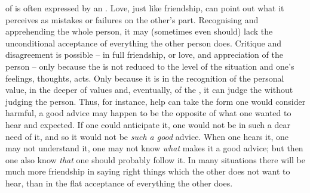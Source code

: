 \pa {} of  is often expressed by an .
Love, just like friendship, can point out what it perceives as mistakes or
failures on the other's part.  Recognising and apprehending the whole person, it
may (sometimes even should) lack the unconditional acceptance of everything the
other person does. Critique and disagreement is possible -- in full friendship,
or love, and appreciation of the person -- only because the  is
not reduced to the level of the  situation and one's feelings,
thoughts, acts.  Only because it is  in the recognition of the
personal value, in the deeper  of values and, eventually, of the
, it can judge the  without judging the person.  Thus, for
instance, help can take the form one would consider harmful, a good advice may
happen to be the opposite of what one wanted to hear and expected. If one
could anticipate it, one would not be in such a dear need of it, and so it would
not be {\em such a good} advice. When one hears it, one may not understand it,
one may not know {\em what} makes it a good advice; but then one also know {\em
  that} one should probably follow it.
In many situations %
there will be much more friendship in saying right things which the other does not
want to hear, than in the flat acceptance of everything the other does.

